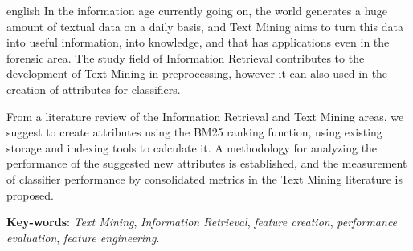 \setlength{\absparsep}{18pt} %
\begin{resumo}[Abstract]
    \begin{otherlanguage*}{english}
        In the information age currently going on, the world generates a huge amount of textual data on a daily basis, and Text Mining aims to turn this data into useful information, into knowledge, and that has applications even in the forensic area.
        The study field of Information Retrieval contributes to the development of Text Mining in preprocessing, however it can also used in the creation of attributes for classifiers.
        
        From a literature review of the Information Retrieval and Text Mining areas, we suggest to create attributes using the BM25 ranking function, using existing storage and indexing tools to calculate it.
        A methodology for analyzing the performance of the suggested new attributes is established, and the measurement of classifier performance by consolidated metrics in the Text Mining literature is proposed.
        	
    	\vspace{\onelineskip}
    
    	\noindent
    	\textbf{Key-words}: \textit{Text Mining}, \textit{Information Retrieval}, \textit{feature creation}, \textit{performance evaluation}, \textit{feature engineering}.

    \end{otherlanguage*}
\end{resumo}